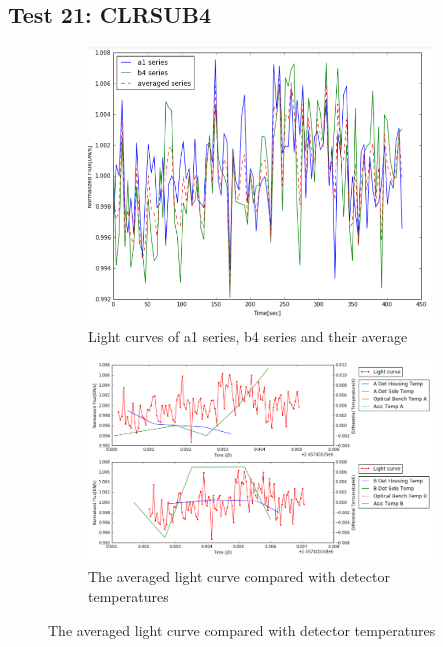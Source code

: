 \documentclass[conference]{IEEEtran}
\begin{document}
\subsection{Test 21: CLRSUB4} 
\begin{figure}[H]
    \centering
    \begin{subfigure}{1}
        \includegraphics[scale=0.4]{ts_test21}
        \caption{Light curves of a1 series, b4 series and their average}
    \end{subfigure}

    \begin{subfigure}{2}
        \includegraphics[scale=0.4]{temp_test21}
        \caption{The averaged light curve compared with detector temperatures}
    \end{subfigure}
   

\end{figure}
\end{document}
